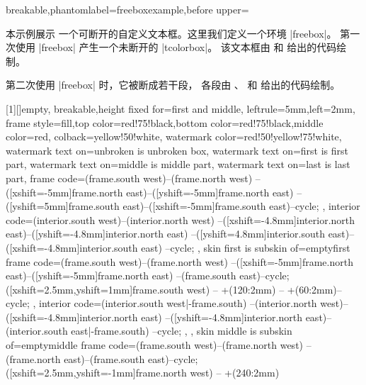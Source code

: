\clearpage
\begin{dispListing*}{breakable,phantomlabel=freeboxexample,before upper={本示例展示
一个可断开的自定义文本框。这里我们定义一个环境 |freebox|。
第一次使用 |freebox| 产生一个未断开的 |tcolorbox|。
该文本框由 
和  给出的代码绘制。\par
第二次使用 |freebox| 时，它被断成若干段，
各段由 、
 和
 给出的代码绘制。
\par\bigskip
}}

[1][]{empty,
  breakable,height fixed for=first and middle,
  leftrule=5mm,left=2mm,
  frame style={fill,top color=red!75!black,bottom color=red!75!black,middle color=red},
  colback=yellow!50!white,
  watermark color=red!50!yellow!75!white,
  watermark text on=unbroken is unbroken box,
  watermark text on=first is first part,
  watermark text on=middle is middle part,
  watermark text on=last is last part,
  frame code={ (frame.south west)--(frame.north west)
    --([xshift=-5mm]frame.north east)--([yshift=-5mm]frame.north east)
    --([yshift=5mm]frame.south east)--([xshift=-5mm]frame.south east)--cycle; },
  interior code={ (interior.south west)--(interior.north west)
    --([xshift=-4.8mm]interior.north east)--([yshift=-4.8mm]interior.north east)
    --([yshift=4.8mm]interior.south east)--([xshift=-4.8mm]interior.south east)
    --cycle; },
  skin first is subskin of={emptyfirst}{%
    frame code={ (frame.south west)--(frame.north west)
      --([xshift=-5mm]frame.north east)--([yshift=-5mm]frame.north east)
      --(frame.south east)--cycle;
      \path[coltria] ([xshift=2.5mm,yshift=1mm]frame.south west) -- +(120:2mm)
      -- +(60:2mm)-- cycle; },
    interior code={ (interior.south west|-frame.south)
      --(interior.north west)--([xshift=-4.8mm]interior.north east)
      --([yshift=-4.8mm]interior.north east)--(interior.south east|-frame.south)
      --cycle; },
  },%
  skin middle is subskin of={emptymiddle}{%
    frame code={ (frame.south west)--(frame.north west)
      --(frame.north east)--(frame.south east)--cycle;
      \path[coltria] ([xshift=2.5mm,yshift=-1mm]frame.north west) -- +(240:2mm)
}}}
\end{dispListing*}
